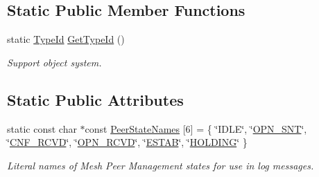 \subsection*{Static Public Member Functions}
\begin{DoxyCompactItemize}
\item 
static \hyperlink{classns3_1_1TypeId}{Type\+Id} \hyperlink{classns3_1_1dot11s_1_1PeerLink_a1618c74faacdb8178e93c24c7e01cbd0}{Get\+Type\+Id} ()
\begin{DoxyCompactList}\small\item\em Support object system. \end{DoxyCompactList}\end{DoxyCompactItemize}
\subsection*{Static Public Attributes}
\begin{DoxyCompactItemize}
\item 
static const char $\ast$const \hyperlink{classns3_1_1dot11s_1_1PeerLink_a4e871141b7dfb68a996542b86fe1e893}{Peer\+State\+Names} \mbox{[}6\mbox{]} = \{ \char`\"{}I\+D\+LE\char`\"{}, \char`\"{}\hyperlink{classns3_1_1dot11s_1_1PeerLink_a432024c7d584aebae1ee15aa88ffb06daa1089dc3061e5fbe15a9693bb6480656}{O\+P\+N\+\_\+\+S\+NT}\char`\"{}, \char`\"{}\hyperlink{classns3_1_1dot11s_1_1PeerLink_a432024c7d584aebae1ee15aa88ffb06da3a6a0efd6b688360adbbe0d2578e99dd}{C\+N\+F\+\_\+\+R\+C\+VD}\char`\"{}, \char`\"{}\hyperlink{classns3_1_1dot11s_1_1PeerLink_a432024c7d584aebae1ee15aa88ffb06dabb9fde9e2c12b30acf6bddb4f9ddb68b}{O\+P\+N\+\_\+\+R\+C\+VD}\char`\"{}, \char`\"{}\hyperlink{classns3_1_1dot11s_1_1PeerLink_a432024c7d584aebae1ee15aa88ffb06da9d6ed7d5e4a66f2a2964b4b77c1ef728}{E\+S\+T\+AB}\char`\"{}, \char`\"{}\hyperlink{classns3_1_1dot11s_1_1PeerLink_a432024c7d584aebae1ee15aa88ffb06dac5609fa8019ce1b47b4612621d5e56da}{H\+O\+L\+D\+I\+NG}\char`\"{} \}
\begin{DoxyCompactList}\small\item\em Literal names of Mesh Peer Management states for use in log messages. \end{DoxyCompactList}\end{DoxyCompactItemize}
